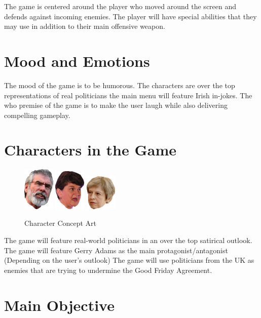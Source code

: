 \documentclass[a4paper]{scrreprt}
\begin{document}
The game is centered around the player who moved around the screen and defends against incoming enemies.
The player will have special abilities that they may use in addition to their main offensive weapon.

\section{Mood and Emotions}

The mood of the game is to be humorous.
The characters are over the top representations of real politicians the main menu will feature Irish in-jokes.
The who premise of the game is to make the user laugh while also delivering compelling gameplay.

\section{Characters in the Game}

\begin{figure}[H]
\begin{addmargin}[13.5em]{0em}
\includegraphics[width=1.5cm]{gerry-right}
\includegraphics[width=1.5cm]{arlene}
\includegraphics[width=1.5cm]{tess}
\end{addmargin}
\caption{\label{fig:art} Character Concept Art}
\end{figure}

The game will feature real-world politicians in an over the top satirical outlook.
The game will feature Gerry Adams as the main protagonist/antagonist (Depending on the user's outlook)
The game will use politicians from the UK as enemies that are trying to undermine the Good Friday Agreement.

\section{Main Objective}
\end{document}
